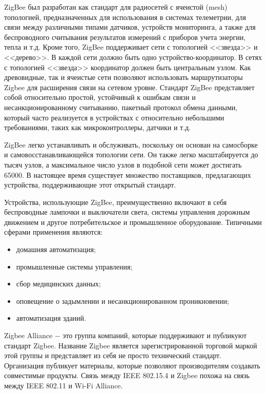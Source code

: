 	ZigBee был разработан как стандарт для радиосетей с ячеистой (mesh) топологией, предназначенных
	для использования в системах телеметрии, для связи между различными типами датчиков, устройств
	мониторинга, а также для беспроводного считывания результатов измерений с приборов учета энергии,
	тепла и т.д. Кроме того, ZigBee поддерживает сети с топологией <<звезда>> и <<дерево>>. В каждой 
	сети должно быть одно устройство-координатор. В сетях с топологией <<звезда>> координатор должен 
	быть центральным узлом. Как древовидные, так и ячеистые сети позволяют использовать маршрутизаторы 
	Zigbee для расширения связи на сетевом уровне.
	Стандарт ZigBee представляет собой относительно простой, устойчивый к ошибкам связи и
	несанкционированному считыванию, пакетный протокол обмена данными, который часто реализуется в
	устройствах с относительно небольшими требованиями, таких как микроконтроллеры, датчики и т.д.
	
	ZigBee легко устанавливать и обслуживать, поскольку он основан на самосборке и самовосстанавливающейся
	топологии сети. Он также легко масштабируется до тысяч узлов, а максимальное число узлов в подобной сети
	может достигать 65000. В настоящее время существует множество поставщиков, предлагающих устройства,
	поддерживающие этот открытый стандарт.
	
	Устройства, использующие ZigBee, преимущественно включают в себя беспроводные лампочки 
	и выключатели света, системы управления дорожным движением и другое потребительское и промышленное 
	оборудование. Типичными сферами применения являются:
	\begin{itemize}
		\item домашняя автоматизация;
		\item промышленные системы управления;
		\item сбор медицинских данных;
		\item оповещение о задымлении и несанкционированном проникновении;
		\item автоматизация зданий.
	\end{itemize}

	Zigbee Alliance $-$ это группа компаний, которые поддерживают и публикуют стандарт Zigbee. Название 
	Zigbee является зарегистрированной торговой маркой этой группы и представляет из себя не просто 
	технический стандарт. Организация публикует материалы, которые позволяют производителям 
	создавать совместимые продукты. Связь между IEEE 802.15.4 и Zigbee похожа на связь между 
	IEEE 802.11 и Wi-Fi Alliance.
	
